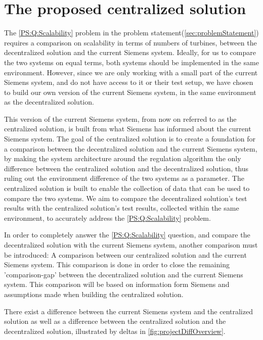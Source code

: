 \chapter{The proposed centralized solution}\label{cha:existingSystem}

The \ref{PS:Q:Scalability} problem in the problem statement(\cref{sec:problemStatement}) requires a comparison on scalability in terms of numbers of turbines, between the decentralized solution and the current Siemens system. Ideally, for us to compare the two systems on equal terms, both systems should be implemented in the same environment. However, since we are only working with a small part of the current Siemens system, and do not have access to it or their test setup, we have chosen to build our own version of the current Siemens system, in the same environment as the decentralized solution.

This version of the current Siemens system, from now on referred to as the centralized solution, is built from what Siemens has informed about the current Siemens system. The goal of the centralized solution is to create a foundation for a comparison between the decentralized solution and the current Siemens system, by making the system architecture around the regulation algorithm the only difference between the centralized solution and the decentralized solution, thus ruling out the environment difference of the two systems as a parameter. The centralized solution is built to enable the collection of data that can be used to compare the two systems. We aim to compare the decentralized solution's test results with the centralized solution's test results, collected within the same environment, to accurately address the \cref{PS:Q:Scalability} problem.

In order to completely answer the \ref{PS:Q:Scalability} question, and compare the decentralized solution with the current Siemens system, another comparison must be introduced: A comparison between our centralized solution and the current Siemens system. This comparison is done in order to close the remaining 'comparison-gap' between the decentralized solution and the current Siemens system. 
This comparison will be based on information form Siemens and assumptions made when building the centralized solution.

There exist a difference between the current Siemens system and the centralized solution as well as a difference between the centralized solution and the decentralized solution, illustrated by deltas in \cref{fig:projectDiffOverview}.

